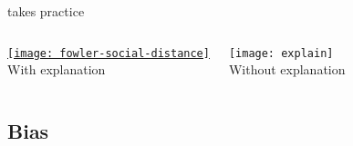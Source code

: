 \documentclass[t]{beamer}
\begin{document}
  \begin{frame}[c]{ takes practice}

    \begin{columns}[T]


      \begin{center}
        \href{http://jhfowler.ucsd.edu/alone_in_the_crowd.pdf}{\texttt{[image: fowler-social-distance]}}\\
        \vspace{0.25cm}
        With explanation
      \end{center}


      \begin{center}
        \texttt{[image: explain]}\\
        \vspace{0.25cm}
        Without explanation
      \end{center}

    \end{columns}

  \end{frame}


  \subsection{Bias}
\end{document}
